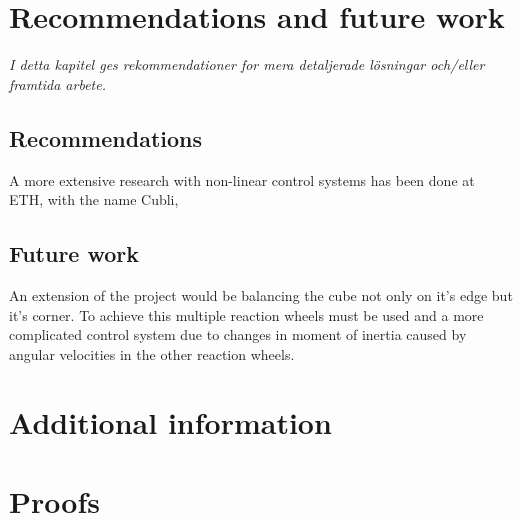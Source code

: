 \documentclass[a4paper,11pt]{kth-mag}
\begin{document}
\chapter{Recommendations and future work}
\emph{I detta kapitel ges rekommendationer for mera detaljerade lösningar och/eller framtida arbete.}

\section{Recommendations}
A more extensive research with non-linear control systems has been done at ETH, with the name Cubli,\cite{cubliECC13}

\section{Future work}
An extension of the project would be balancing the cube not only on it's edge but it's corner. To achieve this multiple reaction wheels must be used and a more complicated control system due to changes in moment of inertia caused by angular velocities in the other reaction wheels.

%
\cleardoublepage


\cleardoublepage
\appendix
{}


\chapter{Additional information} \label{appA}

\chapter{Proofs} \label{appB}

\cleardoublepage   
\cleartoverso %
%

\end{document}
